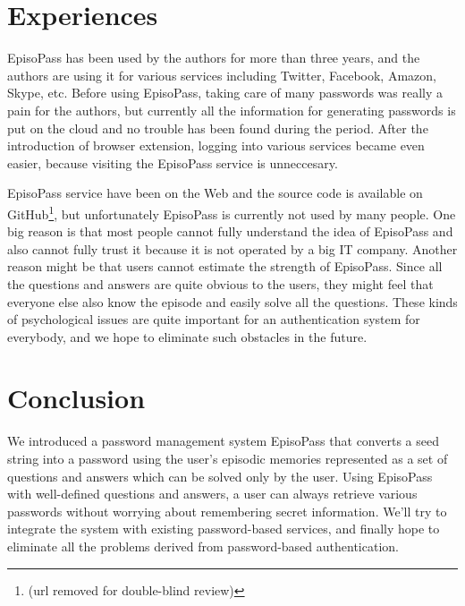 \documentclass[runningheads,a4paper]{llncs}
\begin{document}
\section{Experiences}

EpisoPass has been used by the authors for more than three years, and
the authors are using it for various services including
Twitter, Facebook, Amazon, Skype, etc.
%
Before using EpisoPass, taking care of many passwords was really
a pain for the authors, but
currently all the information for generating passwords is put on the cloud
and no trouble has been found during the period.
%
After the introduction of browser extension,
logging into various services became even easier,
because visiting the EpisoPass service is unneccesary.

EpisoPass service have been on the Web and the source code is
available on GitHub\footnote{
  (url removed for double-blind review)
}, but
unfortunately EpisoPass is currently not used by many people.
One big reason is that most people cannot fully understand the
idea of EpisoPass and also cannot fully trust it
because it is not operated by a big IT company.
Another reason might be that users cannot estimate the strength
of EpisoPass.
Since all the questions and answers are
quite obvious to the users,
they might feel that everyone else also know the episode
and easily solve all the questions.
These kinds of psychological issues are quite important for
an authentication system for everybody,
and we hope to eliminate such obstacles in the future.

\section{Conclusion}

We introduced a password management system EpisoPass
that converts a seed string into a password using the user's
episodic memories represented as a set of questions and answers
which can be solved only by the user.
%
Using EpisoPass with well-defined questions and answers,
a user can always retrieve various passwords without worrying about
remembering secret information.
%
We'll try to integrate the system with existing password-based
services, and finally hope to eliminate all the problems
derived from password-based authentication.
\end{document}
